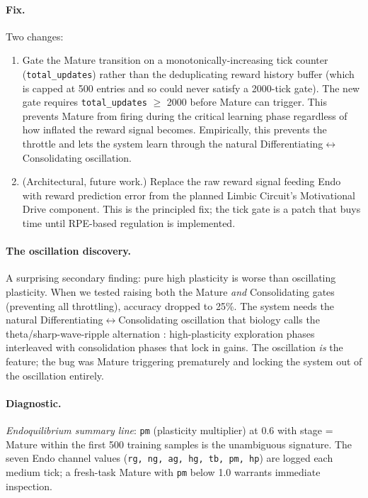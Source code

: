 \paragraph{Fix.}
Two changes:
\begin{enumerate}
  \item Gate the Mature transition on a monotonically-increasing tick counter (\texttt{total\_updates}) rather than the deduplicating reward history buffer (which is capped at 500 entries and so could never satisfy a 2000-tick gate). The new gate requires \texttt{total\_updates} $\geq$ 2000 before Mature can trigger. This prevents Mature from firing during the critical learning phase regardless of how inflated the reward signal becomes. Empirically, this prevents the throttle and lets the system learn through the natural Differentiating$\leftrightarrow$Consolidating oscillation.
  \item (Architectural, future work.) Replace the raw reward signal feeding Endo with reward prediction error from the planned Limbic Circuit's Motivational Drive component. This is the principled fix; the tick gate is a patch that buys time until RPE-based regulation is implemented.
\end{enumerate}

\paragraph{The oscillation discovery.}
A surprising secondary finding: pure high plasticity is worse than oscillating plasticity. When we tested raising both the Mature \emph{and} Consolidating gates (preventing all throttling), accuracy dropped to 25\%. The system needs the natural Differentiating$\leftrightarrow$Consolidating oscillation that biology calls the theta/sharp-wave-ripple alternation \cite{buzsaki2015hippocampal}: high-plasticity exploration phases interleaved with consolidation phases that lock in gains. The oscillation \emph{is} the feature; the bug was Mature triggering prematurely and locking the system out of the oscillation entirely.

\paragraph{Diagnostic.}
\emph{Endoquilibrium summary line}: \texttt{pm} (plasticity multiplier) at 0.6 with stage = Mature within the first 500 training samples is the unambiguous signature. The seven Endo channel values (\texttt{rg, ng, ag, hg, tb, pm, hp}) are logged each medium tick; a fresh-task Mature with \texttt{pm} below 1.0 warrants immediate inspection.

